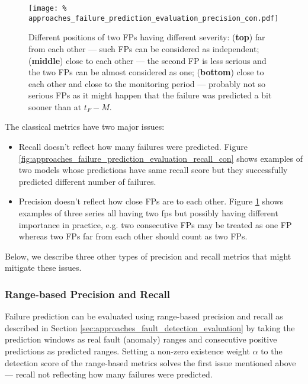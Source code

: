 \begin{figure}[hbt!]
    \texttt{[image: \%
        approaches\_failure\_prediction\_evaluation\_precision\_con.pdf]}
    \centering
    \caption{Different positions of two FPs having different severity:
             (\textbf{top}) far from each other
             --- such FPs can be considered as independent;
             (\textbf{middle}) close to each other
             --- the second FP is less serious and the two FPs can be almost
             considered as one;
             (\textbf{bottom}) close to each other and close to the monitoring period
             --- probably not so serious FPs as it might happen that the failure
             was predicted a bit sooner than at $t_F - M$.}
    \label{fig:approaches_failure_prediction_evaluation_precision_con}
\end{figure}

The classical metrics have two major issues:
\begin{itemize}
    \item Recall doesn't reflect how many failures were predicted.
    Figure \ref{fig:approaches_failure_prediction_evaluation_recall_con} shows examples of two models whose predictions have same recall score but they successfully predicted different number of failures.
    \item Precision doesn't reflect how close FPs are to each other.
    Figure \ref{fig:approaches_failure_prediction_evaluation_precision_con} shows examples of three series all having two \acrshort{fp}s but possibly having different importance in practice, e.g. two consecutive FPs may be treated as one FP whereas two FPs far from each other should count as two FPs.
\end{itemize}
Below, we describe three other types of precision and recall metrics that might mitigate these issues.

\subsubsection{Range-based Precision and Recall}

Failure prediction can be evaluated using range-based precision and recall as described in Section \ref{sec:approaches_fault_detection_evaluation} by taking the prediction windows as real fault (anomaly) ranges and consecutive positive predictions as predicted ranges.
Setting a non-zero existence weight $\alpha$ to the detection score of the range-based metrics solves the first issue mentioned above --- recall not reflecting how many failures were predicted.

